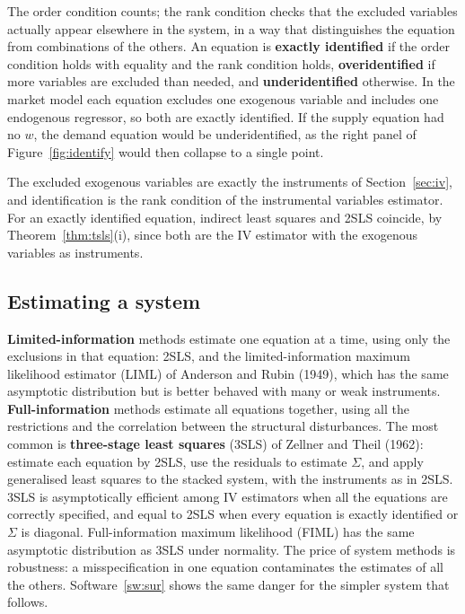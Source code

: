 \documentclass[11pt,a4paper]{article}
\numberwithin{equation}{section}
\theoremstyle{definition}
\begin{document}
The order condition counts; the rank condition checks that the excluded variables actually appear elsewhere in the system, in a way that distinguishes
the equation from combinations of the others. An equation is \textbf{exactly identified} if the order condition holds with equality and the rank
condition holds, \textbf{overidentified} if more variables are excluded than needed, and \textbf{underidentified} otherwise. In the market model each equation
excludes one exogenous variable and includes one endogenous regressor, so both are exactly identified. If the supply equation had no $w$, the demand
equation would be underidentified, as the right panel of Figure~\ref{fig:identify} would then collapse to a single point.

The excluded exogenous variables are exactly the instruments of Section~\ref{sec:iv}, and identification is the rank condition of the instrumental variables
estimator. For an exactly identified equation, indirect least squares and 2SLS coincide, by Theorem~\ref{thm:tsls}(i), since both are the IV estimator with the
exogenous variables as instruments.

\subsection{Estimating a system}
\label{ssec:3sls}

\textbf{Limited-information} methods estimate one equation at a time, using only the exclusions in that equation: 2SLS, and the limited-information
maximum likelihood estimator (LIML) of Anderson and Rubin (1949), which has the same asymptotic distribution but is better behaved with many or weak
instruments. \textbf{Full-information} methods estimate all equations together, using all the restrictions and the correlation between the structural
disturbances. The most common is \textbf{three-stage least squares} (3SLS) of Zellner and Theil (1962): estimate each equation by 2SLS, use the residuals to
estimate $\Sigma$, and apply generalised least squares to the stacked system, with the instruments as in 2SLS. 3SLS is asymptotically efficient among IV
estimators when all the equations are correctly specified, and equal to 2SLS when every equation is exactly identified or $\Sigma$ is diagonal.
Full-information maximum likelihood (FIML) has the same asymptotic distribution as 3SLS under normality. The price of system methods is
robustness: a misspecification in one equation contaminates the estimates of all the others. Software~\ref{sw:sur} shows the same danger for the simpler
system that follows.
\end{document}
